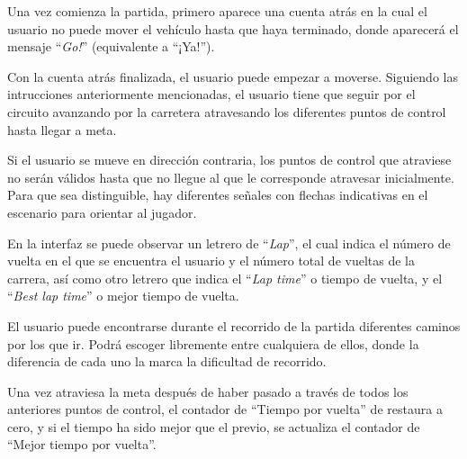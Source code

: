 Una vez comienza la partida, primero aparece una cuenta atrás en la cual el usuario no puede mover el vehículo hasta que haya terminado, donde aparecerá el mensaje ``\textit{Go!}'' (equivalente a ``¡Ya!'').


Con la cuenta atrás finalizada, el usuario puede empezar a moverse. Siguiendo las intrucciones anteriormente mencionadas, el usuario tiene que seguir por el circuito avanzando por la carretera atravesando los diferentes puntos de control hasta llegar a meta. 


Si el usuario se mueve en dirección contraria, los puntos de control que atraviese no serán válidos hasta que no llegue al que le corresponde atravesar inicialmente. Para que sea distinguible, hay diferentes señales con flechas indicativas en el escenario para orientar al jugador.


En la interfaz se puede observar un letrero de ``\textit{Lap}'', el cual indica el número de vuelta en el que se encuentra el usuario y el número total de vueltas de la carrera, así como otro letrero que indica el ``\textit{Lap time}'' o tiempo de vuelta, y el ``\textit{Best lap time}'' o mejor tiempo de vuelta.


El usuario puede encontrarse durante el recorrido de la partida diferentes caminos por los que ir. Podrá escoger libremente entre cualquiera de ellos, donde la diferencia de cada uno la marca la dificultad de recorrido.


Una vez atraviesa la meta después de haber pasado a través de todos los anteriores puntos de control, el contador de ``Tiempo por vuelta'' de restaura a cero, y si el tiempo ha sido mejor que el previo, se actualiza el contador de ``Mejor tiempo por vuelta''.


